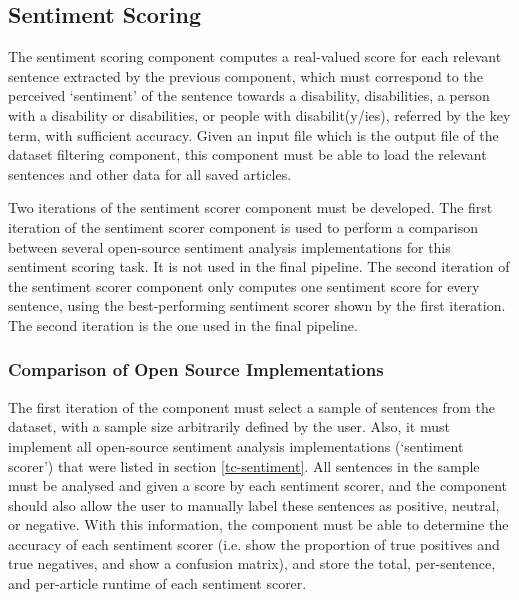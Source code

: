 \documentclass{report}
\begin{document}
\subsection{Sentiment Scoring} \label{req-sentiment}

The sentiment scoring component computes a real-valued score for each relevant sentence extracted by the previous component, which must correspond to the perceived `sentiment' of the sentence towards a disability, disabilities, a person with a disability or disabilities, or people with disabilit(y/ies), referred by the key term, with sufficient accuracy.
Given an input file which is the output file of the dataset filtering component, this component must be able to load the relevant sentences and other data for all saved articles.

Two iterations of the sentiment scorer component must be developed.
The first iteration of the sentiment scorer component is used to perform a comparison between several open-source sentiment analysis implementations for this sentiment scoring task.
It is not used in the final pipeline.
The second iteration of the sentiment scorer component only computes one sentiment score for every sentence, using the best-performing sentiment scorer shown by the first iteration.
The second iteration is the one used in the final pipeline.

\subsubsection{Comparison of Open Source Implementations} \label{req-sentiment-comparison}

The first iteration of the component must select a sample of sentences from the dataset, with a sample size arbitrarily defined by the user.
Also, it must implement all open-source sentiment analysis implementations (`sentiment scorer') that were listed in section \ref{tc-sentiment}.
All sentences in the sample must be analysed and given a score by each sentiment scorer, and the component should also allow the user to manually label these sentences as positive, neutral, or negative.
With this information, the component must be able to determine the accuracy of each sentiment scorer (i.e. show the proportion of true positives and true negatives, and show a confusion matrix), and store the total, per-sentence, and per-article runtime of each sentiment scorer.
\end{document}
